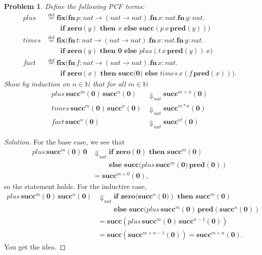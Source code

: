\documentclass{article}
\newtheorem{problem}{Problem}[section]}
\newcommand{\f}{\rightarrow}
\newcommand{\evt}[1]{\Downarrow_\textit{#1}}
\begin{document}
\begin{problem}
    Define the following PCF terms:
    \begin{align*}
        plus &\stackrel{\text{def}}{=} \textbf{fix}(\textbf{fn}\,p:nat\f(nat\f
        nat). \textbf{fn}\,x : nat. \textbf{fn}\,y:nat. \\
        & \quad\quad \textbf{if zero}(y) \textbf{ then }x\textbf{ else
        succ}(p\,x\,\textbf{pred}(y))) \\[2ex]
        times &\stackrel{\text{def}}{=} \textbf{fix}(\textbf{fn}\,t:nat\f(nat\f
        nat). \textbf{fn}\,x : nat. \textbf{fn}\,y:nat. \\
        & \quad\quad \textbf{if zero}(y) \textbf{ then 0 else
        }plus(t\,x\,\textbf{pred}(y))\,x) \\[2ex]
        fact &\stackrel{\text{def}}{=} \textbf{fix}(\textbf{fn}\,f:nat\f(nat\f
        nat). \textbf{fn}\,x : nat. \\
        & \quad\quad \textbf{if zero}(x) \textbf{ then succ(0) else }times\,
        x(f\,\textbf{pred}(x))).
    \end{align*}
    Show by induction on $n\in \mathbb{N}$ that for all $m\in \mathbb{N}$
    \begin{align*}
        plus\,\textbf{succ}^m(\textbf{0})\,\textbf{succ}^n(\textbf{0})
        &\Downarrow_{nat} \textbf{succ}^{m+n}(\textbf{0}) \\
        times\,\textbf{succ}^m(\textbf{0})\,\textbf{succ}^n(\textbf{0})
        &\Downarrow_{nat} \textbf{succ}^{m*n}(\textbf{0}) \\
        fact\,\textbf{succ}^n(\textbf{0}) &\Downarrow_{nat}
        \textbf{succ}^{n!}(\textbf{0})
    \end{align*}
\end{problem}
\begin{proof}[Solution]
    For the base case, we see that
    \begin{align*}
        plus\,\textbf{succ}^m(\textbf{0})\,\textbf{0} &\evt{nat} \textbf{if
        zero}(\textbf{0})\textbf{ then }\textbf{succ}^m(\textbf{0}) \\
        &\quad\quad \textbf{ else
        }\textbf{succ}(plus\,\textbf{succ}^m(\textbf{0)}\,\textbf{pred}(\textbf{0}))
        \\ &= \textbf{succ}^{m+0}(\textbf{0}),
    \end{align*}
    so the statement holds. For the inductive case,
    \begin{align*}
        plus\,\textbf{succ}^m(\textbf{0})\,\textbf{succ}^n(\textbf{0})
        &\evt{nat} \textbf{if zero}(\textbf{succ}^n(\textbf{0)})\textbf{ then
        }\textbf{succ}^m(\textbf{0}) \\
        &\quad\quad \textbf{ else
        }\textbf{succ}(plus\,\textbf{succ}^m(\textbf{0})\,\textbf{pred}(\textbf{succ}^n(\textbf{0}))
        \\
        &= \textbf{succ}(plus\,\textbf{succ}^m(\textbf{0})\,\textbf{succ}^{n-1}(\textbf{0})) \\
        &= \textbf{succ}(\textbf{succ}^{m+n-1}(\textbf{0})) =
        \textbf{succ}^{m+n}(\textbf{0}).
    \end{align*}
    You get the idea.
\end{proof}
\end{document}
